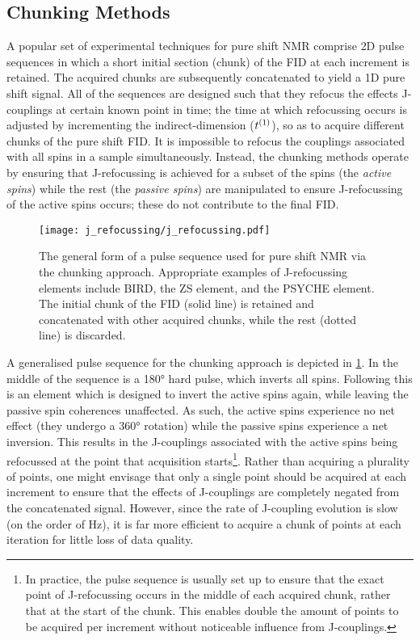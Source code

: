 \subsection{Chunking Methods}
A popular set of experimental techniques for pure shift \ac{NMR} comprise
\ac{2D} pulse sequences in which a short initial section (chunk) of the
\ac{FID} at each increment is retained\cite{Adams2014}. The acquired chunks are
subsequently concatenated to yield a \ac{1D} pure shift signal.  All of the
sequences are designed such that they refocus the effects J-couplings at
certain known point in time;
the time at which refocussing occurs is adjusted by incrementing
the indirect-dimension ($t^{(1)}$), so as to acquire
different chunks of the pure shift \ac{FID}. It is impossible to refocus the
couplings associated with all spins in a sample simultaneously. Instead, the
chunking methods operate by ensuring that J-refocussing is achieved for a
subset of the spins (the \emph{active spins}) while the rest (the \emph{passive
spins}) are manipulated to ensure J-refocussing of the active spins occurs;
these do not contribute to the final \ac{FID}.

\begin{figure}
    \centering
    \texttt{[image: j\_refocussing/j\_refocussing.pdf]}
    \caption[
        The general form of a pulse sequence used for pure shift \acs{NMR}
        using the chunking approach.
    ]{
        The general form of a pulse sequence used for pure shift \acs{NMR}
        via the chunking approach. Appropriate examples of J-refocussing
        elements include \acs{BIRD}, the \acl{ZS} element, and the
        \acs{PSYCHE} element. The initial chunk of the \ac{FID} (solid
        line) is retained and concatenated with other acquired chunks,
        while the rest (dotted line) is discarded.
    }
    \label{fig:j-refocussing}
\end{figure}
\makeatletter
{}
\makeatother

A generalised pulse sequence for the chunking approach is depicted in
\cref{fig:j-refocussing}. In the middle of the sequence is a \ang{180} hard
pulse, which inverts all spins. Following this is an element which is designed
to invert the active spins again, while leaving the passive spin coherences
unaffected. As such, the active spins experience no net effect (they
undergo a \ang{360} rotation) while the passive spins experience a net inversion.
This results in the J-couplings associated with the active spins being
refocussed at the point that acquisition starts\footnote{
    In practice, the pulse sequence is usually set up to ensure that the exact
    point of J-refocussing occurs in the middle of each acquired chunk, rather
    that at the start of the chunk. This enables double the amount
    of points to be acquired per increment without noticeable influence from
    J-couplings.
}.
Rather than acquiring a plurality of points, one might envisage that only a
single point should be acquired at each increment to
ensure that the effects of J-couplings are completely negated from the
concatenated signal. However, since the rate of J-coupling evolution is
slow (on the order of \unit{\hertz}), it is far more efficient to acquire a
chunk of points at each iteration for little loss of data quality.

